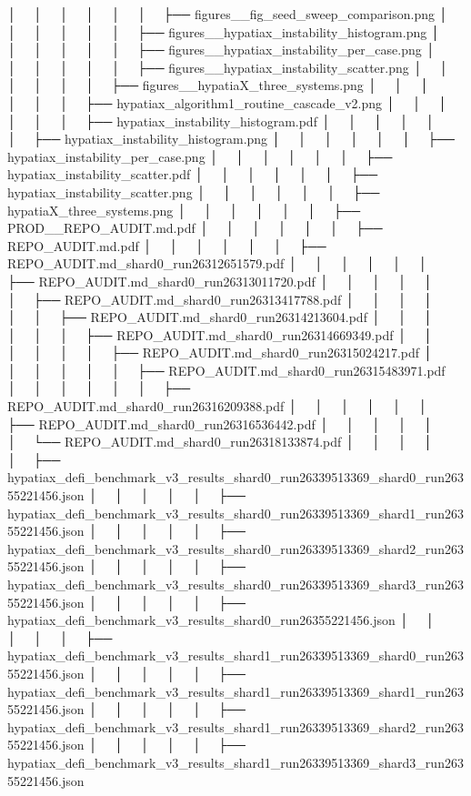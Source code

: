 │   │       │   │   │   │   ├── figures__fig_seed_sweep_comparison.png
│   │       │   │   │   │   ├── figures__hypatiax_instability_histogram.png
│   │       │   │   │   │   ├── figures__hypatiax_instability_per_case.png
│   │       │   │   │   │   ├── figures__hypatiax_instability_scatter.png
│   │       │   │   │   │   ├── figures__hypatiaX_three_systems.png
│   │       │   │   │   │   ├── hypatiax_algorithm1_routine_cascade_v2.png
│   │       │   │   │   │   ├── hypatiax_instability_histogram.pdf
│   │       │   │   │   │   ├── hypatiax_instability_histogram.png
│   │       │   │   │   │   ├── hypatiax_instability_per_case.png
│   │       │   │   │   │   ├── hypatiax_instability_scatter.pdf
│   │       │   │   │   │   ├── hypatiax_instability_scatter.png
│   │       │   │   │   │   ├── hypatiaX_three_systems.png
│   │       │   │   │   │   ├── PROD__REPO_AUDIT.md.pdf
│   │       │   │   │   │   ├── REPO_AUDIT.md.pdf
│   │       │   │   │   │   ├── REPO_AUDIT.md_shard0_run26312651579.pdf
│   │       │   │   │   │   ├── REPO_AUDIT.md_shard0_run26313011720.pdf
│   │       │   │   │   │   ├── REPO_AUDIT.md_shard0_run26313417788.pdf
│   │       │   │   │   │   ├── REPO_AUDIT.md_shard0_run26314213604.pdf
│   │       │   │   │   │   ├── REPO_AUDIT.md_shard0_run26314669349.pdf
│   │       │   │   │   │   ├── REPO_AUDIT.md_shard0_run26315024217.pdf
│   │       │   │   │   │   ├── REPO_AUDIT.md_shard0_run26315483971.pdf
│   │       │   │   │   │   ├── REPO_AUDIT.md_shard0_run26316209388.pdf
│   │       │   │   │   │   ├── REPO_AUDIT.md_shard0_run26316536442.pdf
│   │       │   │   │   │   └── REPO_AUDIT.md_shard0_run26318133874.pdf
│   │       │   │   │   ├── hypatiax_defi_benchmark_v3_results_shard0_run26339513369_shard0_run26355221456.json
│   │       │   │   │   ├── hypatiax_defi_benchmark_v3_results_shard0_run26339513369_shard1_run26355221456.json
│   │       │   │   │   ├── hypatiax_defi_benchmark_v3_results_shard0_run26339513369_shard2_run26355221456.json
│   │       │   │   │   ├── hypatiax_defi_benchmark_v3_results_shard0_run26339513369_shard3_run26355221456.json
│   │       │   │   │   ├── hypatiax_defi_benchmark_v3_results_shard0_run26355221456.json
│   │       │   │   │   ├── hypatiax_defi_benchmark_v3_results_shard1_run26339513369_shard0_run26355221456.json
│   │       │   │   │   ├── hypatiax_defi_benchmark_v3_results_shard1_run26339513369_shard1_run26355221456.json
│   │       │   │   │   ├── hypatiax_defi_benchmark_v3_results_shard1_run26339513369_shard2_run26355221456.json
│   │       │   │   │   ├── hypatiax_defi_benchmark_v3_results_shard1_run26339513369_shard3_run26355221456.json
